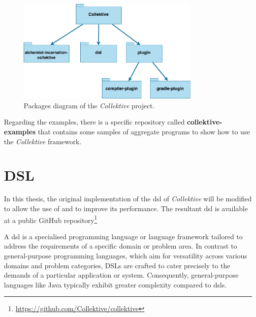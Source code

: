 \begin{figure}[h!]
    \centering
    \includegraphics[width=0.8\textwidth]{figures/packages}
    \caption{Packages diagram of the \emph{Collektive} project.}
    \label{fig:pacakges}
\end{figure}

Regarding the examples, there is a specific repository called \textbf{collektive-examples} that contains some samples of
aggregate programs to show how to use the \emph{Collektive} framework.

\section{DSL}
\label{sec:dsl}
In this thesis, the original implementation of the \ac{dsl} of \emph{Collektive} will be modified to allow the use of \xc{}
and to improve its performance.
The resultant \ac{dsl} is available at a public GitHub repository\footnote{\url{https://github.com/Collektive/collektive}}

A \ac{dsl} is a specialised programming language or language framework tailored to address the
requirements of a specific domain or problem area.
In contrast to general-purpose programming languages, which aim for versatility across various domains and problem categories,
DSLs are crafted to cater precisely to the demands of a particular application or system.
Consequently, general-purpose languages like Java typically exhibit greater complexity compared to \acp{dsl}.


